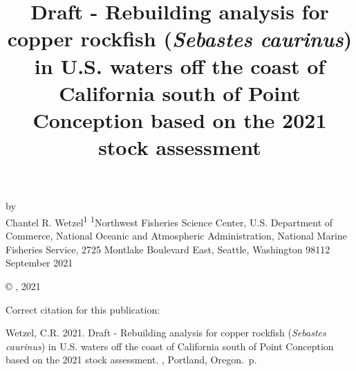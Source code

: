 \documentclass[11pt,
  english,
  a4paper,
]{article}
\date{}
\newcommand{\trTitle}{Draft - Rebuilding analysis for copper rockfish (\emph{Sebastes caurinus}) in U.S. waters off the coast of California south of Point Conception based on the 2021 stock assessment}
\newcommand{\trYear}{2021}
\newcommand{\trMonth}{September}
\newcommand{\trAuthsBack}{Wetzel, C.R}
\newcommand{\trCitation}{
\begin{hangparas}{1em}{1}
\trAuthsBack{}. \trYear{}. \trTitle{}. \glsentrylong{pfmc}, Portland, Oregon. \pageref{LastPage}{}\,p.
\end{hangparas}}
\begin{document}

\renewcommand*{\thefootnote}{\fnsymbol{footnote}}

\small
\thispagestyle{empty}
\noindent
\begin{center}
\title{Draft - Rebuilding analysis for copper rockfish (\emph{Sebastes caurinus}) in U.S. waters off the coast of California south of Point Conception based on the 2021 stock assessment}
\vspace{1.5cm}
{\Large\textbf{}}
\vfill
by\\
Chantel R. Wetzel\textsuperscript{1}\vfill
\textsuperscript{1}Northwest Fisheries Science Center, U.S. Department of Commerce, National Oceanic and Atmospheric Administration, National Marine Fisheries Service, 2725 Montlake Boulevard East, Seattle, Washington 98112\vfill
\trMonth{} \trYear{}
\end{center}
\clearpage

\thispagestyle{empty}
\vspace*{\fill}
\begin{center}
\copyright{} , \trYear{}\\
\end{center}
\par
\bigskip
\noindent
Correct citation for this publication:
\bigskip
\par
\trCitation{}
\clearpage


\tableofcontents\clearpage
\label{TRlastRoman}
\clearpage

\newpage
\thispagestyle{empty} %

\pagestyle{plain}  %
\renewcommand*{\thefootnote}{\arabic{footnote}}  %
\setcounter{footnote}{0}  %
\renewcommand{\headrulewidth}{0.5pt}
\renewcommand{\footrulewidth}{0.5pt}
\end{document}
